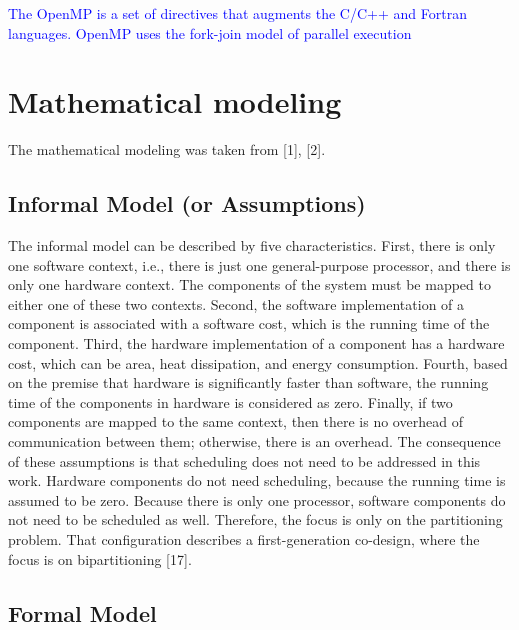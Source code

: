 \textcolor{blue}{The OpenMP is a set of directives that augments the C/C++ and Fortran languages. OpenMP uses the fork-join model of parallel execution}

\section{Mathematical modeling}

The mathematical modeling was taken from [1], [2].

\subsection{Informal Model (or Assumptions)}

The informal model can be described by five characteristics. First, there is only one software context, i.e., there is just one general-purpose processor, and there is only one hardware context. The components of the system must be mapped to either one of these two contexts. Second, the software implementation of a component is associated with a software cost, which is the running time of the component. Third, the hardware implementation of a component has a hardware cost, which can be area, heat dissipation, and energy consumption. Fourth, based on the premise that hardware is significantly faster than software, the running time of the components in hardware is considered as zero. Finally, if two components are mapped to the same context, then there is no overhead of communication between them; otherwise, there is an overhead. The consequence of these assumptions is that scheduling does not need to be addressed in this work. Hardware components do not need scheduling, because the running time is assumed to be zero. Because there is only one processor, software components do not need to be scheduled as well. Therefore, the focus is only on the partitioning problem. That configuration describes a first-generation co-design, where the focus is on bipartitioning [17].

\subsection{Formal Model}

